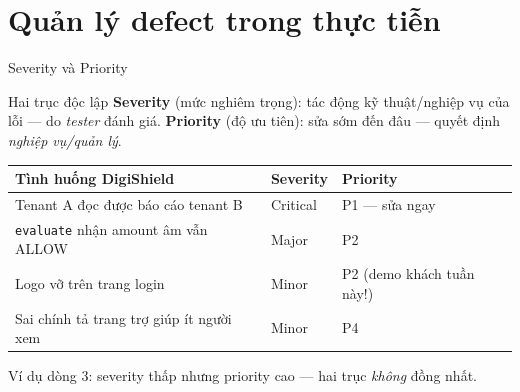 \documentclass[aspectratio=169,12pt]{beamer}
\begin{document}
\section{Quản lý defect trong thực tiễn}

\begin{frame}{Severity và Priority}
  \begin{block}{Hai trục độc lập}
    \textbf{Severity} (mức nghiêm trọng): tác động kỹ thuật/nghiệp vụ của lỗi --- do \emph{tester} đánh giá.
    \textbf{Priority} (độ ưu tiên): sửa sớm đến đâu --- quyết định \emph{nghiệp vụ/quản lý}.
  \end{block}
  \small
  \begin{table}
    \small
    \begin{tabular}{@{}lll@{}}
      \toprule
      \textbf{Tình huống DigiShield} & \textbf{Severity} & \textbf{Priority} \\
      \midrule
      Tenant A đọc được báo cáo tenant B & Critical & P1 --- sửa ngay \\
      \texttt{evaluate} nhận amount âm vẫn ALLOW & Major & P2 \\
      Logo vỡ trên trang login & Minor & \alert{P2 (demo khách tuần này!)} \\
      Sai chính tả trang trợ giúp ít người xem & Minor & P4 \\
      \bottomrule
    \end{tabular}
  \end{table}
  \small Ví dụ dòng 3: severity thấp nhưng priority cao --- hai trục \emph{không} đồng nhất.
\end{frame}
\end{document}
